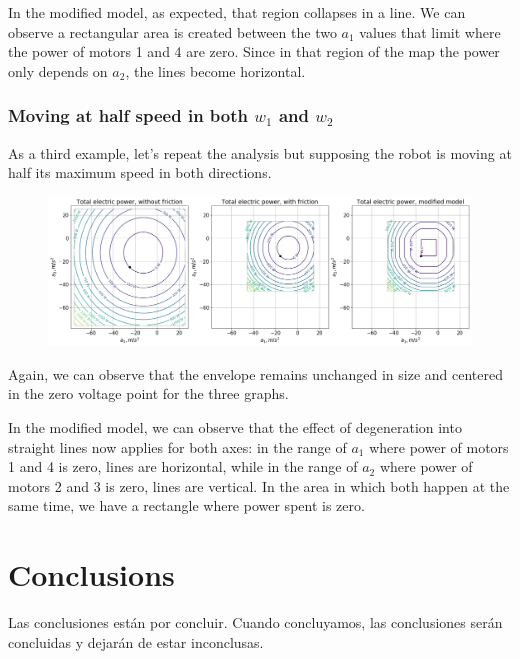 \documentclass[12pt]{article}
\begin{document}
In the modified model, as expected, that region collapses in a line. We can observe a rectangular area is created between the two $a_1$ values that limit where the power of motors 1 and 4 are zero. Since in that region of the map the power only depends on $a_2$, the lines become horizontal.

\subsubsection*{Moving at half speed in both $w_1$ and $w_2$}
As a third example, let's repeat the analysis but supposing the robot is moving at half its maximum speed in both directions.

\begin{figure}[h]
	\centering
	\includegraphics[width=1\linewidth]{power_from_w1_w2}
	\label{fig:power_from_w1_w2}
\end{figure}

Again, we can observe that the envelope remains unchanged in size and centered in the zero voltage point for the three graphs.

In the modified model, we can observe that the effect of degeneration into straight lines now applies for both axes: in the range of $a_1$ where power of motors 1 and 4 is zero, lines are horizontal, while in the range of $a_2$ where power of motors 2 and 3 is zero, lines are vertical. In the area in which both happen at the same time, we have a rectangle where power spent is zero.

\section*{Conclusions}

Las conclusiones están por concluir. Cuando concluyamos, las conclusiones serán concluidas y dejarán de estar inconclusas.
\end{document}
